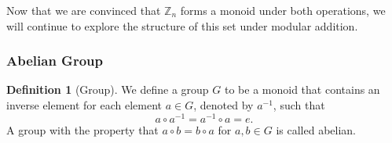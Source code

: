 \documentclass[10pt, titlepage]{amsart}
\newcommand\Z{{\mathbb Z}}
\theoremstyle{definition}
\newtheorem{definition}{Definition}[subsection]
\begin{document}
	Now that we are convinced that $\Z_n$ forms a monoid under both operations, we will continue to explore the structure of this set under modular addition. 

	\subsubsection{Abelian Group}
	
	\begin{definition}[Group]\label{definition:group}
		We define a group $G$ to be a monoid that contains an inverse element for each element $a \in G$, denoted by $a^{-1}$, such that $$a \circ a^{-1} = a^{-1} \circ a = e.$$
		A group with the property that $a \circ b = b \circ a$ for $a,b \in G$ is called abelian.
	\end{definition}
	
\end{document}
